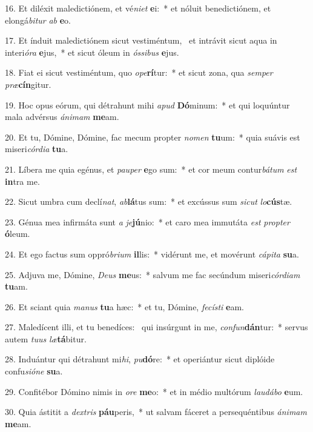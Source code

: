 16. Et diléxit maledictiónem, et vé\textit{ni}\textit{et} \textbf{e}i:~*  et nóluit benedictiónem, et elongá\textit{bi}\textit{tur} \textit{ab} \textbf{e}o.\

17. Et índuit maledictiónem sicut vestiméntum, \dag\  et intrávit sicut aqua in interi\textit{ó}\textit{ra} \textbf{e}jus,~*  et sicut óleum in \textit{ós}\textit{si}\textit{bus} \textbf{e}jus.\

18. Fiat ei sicut vestiméntum, quo \textit{o}\textit{pe}\textbf{rí}tur:~*  et sicut zona, qua \textit{sem}\textit{per} \textit{præ}\textbf{cín}gitur.\

19. Hoc opus eórum, qui détrahunt mihi \textit{a}\textit{pud} \textbf{Dó}minum:~*  et qui loquúntur mala advérsus \textit{á}\textit{ni}\textit{mam} \textbf{me}am.\

20. Et tu, Dómine, Dómine, fac mecum propter \textit{no}\textit{men} \textbf{tu}um:~*  quia suávis est miseri\textit{cór}\textit{di}\textit{a} \textbf{tu}a.\

21. Líbera me quia egénus, et \textit{pau}\textit{per} \textbf{e}go sum:~*  et cor meum contur\textit{bá}\textit{tum} \textit{est} \textbf{in}tra me.\

22. Sicut umbra cum declí\textit{nat}, \textit{ab}\textbf{lá}tus sum:~*  et excússus sum \textit{sic}\textit{ut} \textit{lo}\textbf{cús}tæ.\

23. Génua mea infirmáta sunt \textit{a} \textit{je}\textbf{jú}nio:~*  et caro mea immutáta \textit{est} \textit{prop}\textit{ter} \textbf{ó}leum.\

24. Et ego factus sum oppró\textit{bri}\textit{um} \textbf{il}lis:~*  vidérunt me, et movérunt \textit{cá}\textit{pi}\textit{ta} \textbf{su}a.\

25. Adjuva me, Dómine, \textit{De}\textit{us} \textbf{me}us:~*  salvum me fac secúndum miseri\textit{cór}\textit{di}\textit{am} \textbf{tu}am.\

26. Et sciant quia \textit{ma}\textit{nus} \textbf{tu}a hæc:~*  et tu, Dómine, \textit{fe}\textit{cís}\textit{ti} \textbf{e}am.\

27. Maledícent illi, et tu benedíces: \dag\  qui insúrgunt in me, \textit{con}\textit{fun}\textbf{dán}tur:~*  servus autem \textit{tu}\textit{us} \textit{læ}\textbf{tá}bitur.\

28. Induántur qui détrahunt mi\textit{hi}, \textit{pu}\textbf{dó}re:~*  et operiántur sicut diplóide confu\textit{si}\textit{ó}\textit{ne} \textbf{su}a.\

29. Confitébor Dómino nimis in \textit{o}\textit{re} \textbf{me}o:~*  et in médio multórum \textit{lau}\textit{dá}\textit{bo} \textbf{e}um.\

30. Quia ástitit a \textit{dex}\textit{tris} \textbf{páu}peris,~*  ut salvam fáceret a persequéntibus \textit{á}\textit{ni}\textit{mam} \textbf{me}am.\

